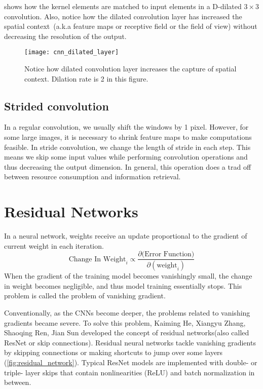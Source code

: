      shows how the kernel elements are matched to input elements in a D-dilated $3\times3$ convolution. Also, notice how the dilated convolution layer has increased the spatial context~(a.k.a feature maps or receptive field or the field of view) without decreasing the resolution of the output.
    \begin{figure}[h!]
        \centering
        \texttt{[image: cnn\_dilated\_layer]}
        \caption[Dilated convolution layer]{Notice how dilated convolution layer increases the capture of spatial context. Dilation rate is 2 in this figure.}
        \label{fig:dilated_layer}
    \end{figure}


\subsection{Strided convolution}
    In a regular convolution, we usually shift the windows by 1 pixel. However, for some large images, it is necessary to shrink feature maps to make computations feasible. In stride convolution, we change the length of stride in each step. This means we skip some input values while performing convolution operations and thus decreasing the output dimension. In general, this operation does a trad off between resource consumption and information retrieval.

\section[Residual Networks]{Residual Networks}

In a neural network, weights receive an update proportional to the gradient of current weight in each iteration. \begin{equation} \text{Change\ In\ Weight}_{i} \propto \frac{\partial(\text{Error\ Function)}}{\partial(\text{weight}_{i})} \end{equation} When the gradient of the training model becomes vanishingly small, the change in weight becomes negligible, and thus model training essentially stops. This problem is called the problem of vanishing gradient.

Conventionally, as the CNNs become deeper, the problems related to vanishing gradients became severe. To solve this problem, {Kaiming He, Xiangyu Zhang, Shaoqing Ren, Jian Sun}\cite{ResNet} developed the concept of residual networks(also called ResNet or skip connections). Residual neural networks tackle vanishing gradients by skipping connections or making shortcuts to jump over some layers (\cref{fig:residual_network}). Typical ResNet models are implemented with double- or triple- layer skips that contain nonlinearities (ReLU) and batch normalization in between.

